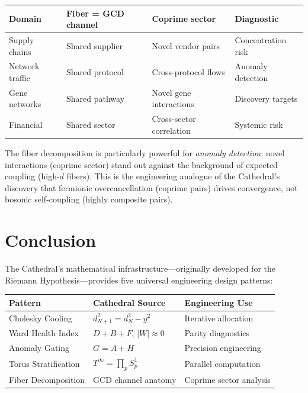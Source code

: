 \documentclass[11pt,a4paper]{article}
\begin{document}
\begin{center}
\small
\begin{tabular}{@{}lllp{4cm}@{}}
\toprule
\textbf{Domain} & \textbf{Fiber = GCD channel} & \textbf{Coprime sector} & \textbf{Diagnostic} \\
\midrule
Supply chains & Shared supplier & Novel vendor pairs & Concentration risk \\
Network traffic & Shared protocol & Cross-protocol flows & Anomaly detection \\
Gene networks & Shared pathway & Novel gene interactions & Discovery targets \\
Financial & Shared sector & Cross-sector correlation & Systemic risk \\
\bottomrule
\end{tabular}
\end{center}

The fiber decomposition is particularly powerful for
\emph{anomaly detection}: novel interactions (coprime sector)
stand out against the background of expected coupling
(high-$d$ fibers). This is the engineering analogue of the
Cathedral's discovery that fermionic overcancellation (coprime
pairs) drives convergence, not bosonic self-coupling
(highly composite pairs).

\section{Conclusion}

The Cathedral's mathematical infrastructure---originally developed
for the Riemann Hypothesis---provides five universal engineering
design patterns:

\begin{center}
\small
\begin{tabular}{@{}lll@{}}
\toprule
\textbf{Pattern} & \textbf{Cathedral Source} & \textbf{Engineering Use} \\
\midrule
Cholesky Cooling & $d^2_{N+1} = d^2_N - y^2$ & Iterative allocation \\
Ward Health Index & $D + B + F$, $|W| \approx 0$ & Parity diagnostics \\
Anomaly Gating & $G = A + H$ & Precision engineering \\
Torus Stratification & $T^\infty = \prod_p S^1_p$ & Parallel computation \\
Fiber Decomposition & GCD channel anatomy & Coprime sector analysis \\
\bottomrule
\end{tabular}
\end{center}
\end{document}
